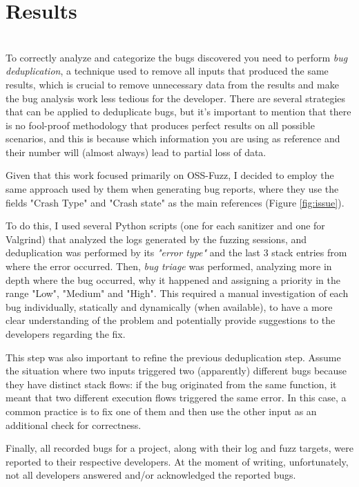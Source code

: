 \chapter{Results} \label{chap_4}
\ \\
To correctly analyze and categorize the bugs discovered you need to perform \textit{bug deduplication}, a technique used to remove all inputs that produced the same results, which is crucial to remove unnecessary data from the results and make the bug analysis work less tedious for the developer.
There are several strategies that can be applied to deduplicate bugs, but it's important to mention that there is no fool-proof methodology that produces perfect results on all possible scenarios, and this is because which information you are using as reference and their number will (almost always) lead to partial loss of data.

Given that this work focused primarily on OSS-Fuzz, I decided to employ the same approach used by them when generating bug reports, where they use the fields "Crash Type" and "Crash state" as the main references (Figure \ref{fig:issue}).

To do this, I used several Python scripts (one for each sanitizer and one for Valgrind) that analyzed the logs generated by the fuzzing sessions, and deduplication was performed by its \textit{"error type"} and the last 3 stack entries from where the error occurred.
Then, \textit{bug triage} was performed, analyzing more in depth where the bug occurred, why it happened and assigning a priority in the range "Low", "Medium" and "High". This required a manual investigation of each bug individually, statically and dynamically (when available), to have a more clear understanding of the problem and potentially provide suggestions to the developers regarding the fix.

This step was also important to refine the previous deduplication step.  Assume the situation where two inputs triggered two (apparently) different bugs because they have distinct stack flows: if the bug originated from the same function, it meant that two different execution flows triggered the same error. In this case, a common practice is to fix one of them and then use the other input as an additional check for correctness.

Finally, all recorded bugs for a project, along with their log and fuzz targets, were reported to their respective developers.
At the moment of writing, unfortunately, not all developers answered and/or acknowledged the reported bugs.




